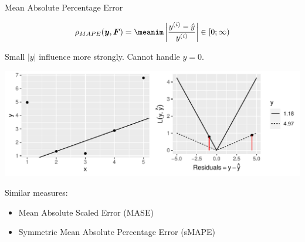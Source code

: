 \begin{vbframe}{Mean Absolute Percentage Error}


$$ 
\rho_{MAPE}(\yv, \F) = \meanim \left\rvert \frac{\yi - \yih}{\yi} \right\rvert \in [0;\infty) 
$$

\vfill

\begin{minipage}[c]{0.33\textwidth}
  \raggedright
  \small
  
Small $|y|$ influence more strongly. Cannot handle $y=0$.
\end{minipage}%
\begin{minipage}[c]{0.67\textwidth}
  \begin{knitrout}\scriptsize
  \color{fgcolor}
  {\includegraphics[width=\textwidth]{figure/eval_mape}}
\end{knitrout}
\end{minipage}

\vfill

\small
Similar measures:

\begin{itemize}
  \small
  \item Mean Absolute Scaled Error (MASE)
  \item Symmetric Mean Absolute Percentage Error (sMAPE)
\end{itemize}

\end{vbframe}



